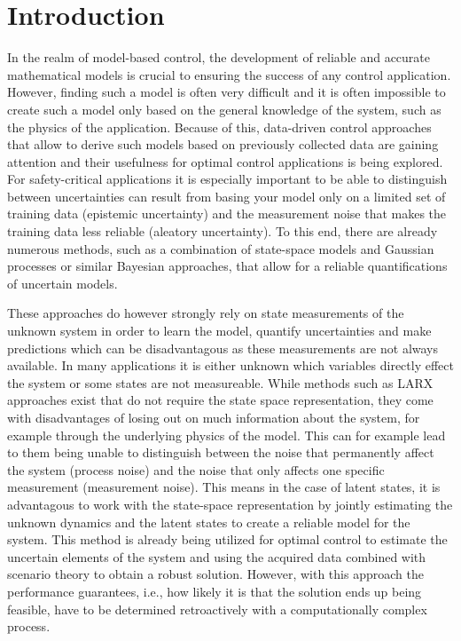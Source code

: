 \chapter{Introduction}
\label{sec:introduction}

In the realm of model-based control, the development of reliable and accurate mathematical models is crucial to ensuring the success of any control application. However, finding such a model is often very difficult and it is often impossible to create such a model only based on the general knowledge of the system, such as the physics of the application. Because of this, data-driven control approaches that allow to derive such models based on previously collected data are gaining attention and their usefulness for optimal control applications is being explored. For safety-critical applications it is especially important to be able to distinguish between uncertainties can result from basing your model only on a limited set of training data (epistemic uncertainty) and the measurement noise that makes the training data less reliable (aleatory uncertainty). To this end, there are already numerous methods, such as a combination of state-space models and Gaussian processes \cite{Williams_06} or similar Bayesian approaches, that allow for a reliable quantifications of uncertain models.

These approaches do however strongly rely on state measurements of the unknown system in order to learn the model, quantify uncertainties and make predictions which can be disadvantagous as these measurements are not always available. In many applications it is either unknown which variables directly effect the system or some states are not measureable. While methods such as LARX approaches \cite{Maiworm_21} exist that do not require the state space representation, they come with disadvantages of losing out on much information about the system, for example through the underlying physics of the model. This can for example lead to them being unable to distinguish between the noise that permanently affect the system (process noise) and the noise that only affects one specific measurement (measurement noise). This means in the case of latent states, it is advantagous to work with the state-space representation by jointly estimating the unknown dynamics and the latent states to create a reliable model for the system. This method is already being utilized for optimal control \cite{Robert_24} to estimate the uncertain elements of the system and using the acquired data combined with scenario theory \cite{Garatti_22} to obtain a robust solution. However, with this approach the performance guarantees, i.e., how likely it is that the solution ends up being feasible, have to be determined retroactively with a computationally complex process.
 
